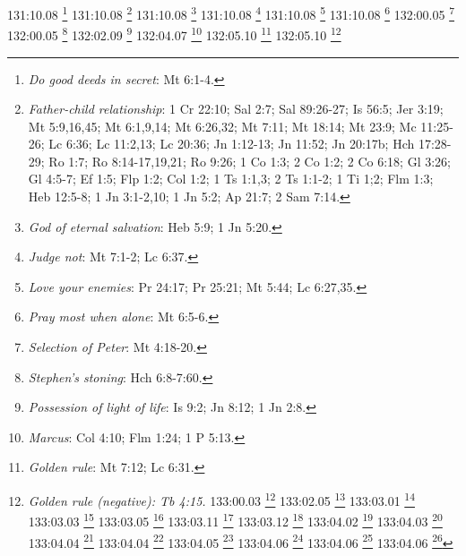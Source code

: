 {{{{{{{{{{{{{{{{{{{{{{{{{{{{{{{131:10.08 \footnote{\textit{Do good deeds in secret}: Mt 6:1-4.}
131:10.08 \footnote{\textit{Father-child relationship}: 1 Cr 22:10; Sal 2:7; Sal 89:26-27; Is 56:5; Jer 3:19; Mt 5:9,16,45; Mt 6:1,9,14; Mt 6:26,32; Mt 7:11; Mt 18:14; Mt 23:9; Mc 11:25-26; Lc 6:36; Lc 11:2,13; Lc 20:36; Jn 1:12-13; Jn 11:52; Jn 20:17b; Hch 17:28-29; Ro 1:7; Ro 8:14-17,19,21; Ro 9:26; 1 Co 1:3; 2 Co 1:2; 2 Co 6:18; Gl 3:26; Gl 4:5-7; Ef 1:5; Flp 1:2; Col 1:2; 1 Ts 1:1,3; 2 Ts 1:1-2; 1 Ti 1;2; Flm 1:3; Heb 12:5-8; 1 Jn 3:1-2,10; 1 Jn 5:2; Ap 21:7; 2 Sam 7:14.}
131:10.08 \footnote{\textit{God of eternal salvation}: Heb 5:9; 1 Jn 5:20.}
131:10.08 \footnote{\textit{Judge not}: Mt 7:1-2; Lc 6:37.}
131:10.08 \footnote{\textit{Love your enemies}: Pr 24:17; Pr 25:21; Mt 5:44; Lc 6:27,35.}
131:10.08 \footnote{\textit{Pray most when alone}: Mt 6:5-6.}
132:00.05 \footnote{\textit{Selection of Peter}: Mt 4:18-20.}
132:00.05 \footnote{\textit{Stephen's stoning}: Hch 6:8-7:60.}
132:02.09 \footnote{\textit{Possession of light of life}: Is 9:2; Jn 8:12; 1 Jn 2:8.}
132:04.07 \footnote{\textit{Marcus}: Col 4:10; Flm 1:24; 1 P 5:13.}
132:05.10 \footnote{\textit{Golden rule}: Mt 7:12; Lc 6:31.}
132:05.10 \footnote{\textit{Golden rule (negative): Tb 4:15.}
133:00.03 \footnote{\textit{God is no respecter of persons}: 2 Cr 19:7; Job 34:19; Eclo 35:12; Hch 10:34; Ro 2:11; Gl 2:6; Gl 3:28; Ef 6:9; Col 3:11.}
133:02.05 \footnote{\textit{Wintered in Nicopolis}: Tit 3:12.}
133:03.01 \footnote{\textit{Crispus}: Hch 18:8; 1 Co 1:14.}
133:03.03 \footnote{\textit{Silas and Timothy}: Hch 18:5.}
133:03.05 \footnote{\textit{Justus}: Hch 18:7; Col 4:11.}
133:03.11 \footnote{\textit{Gaius}: Hch 19:29; Hch 20:4; Ro 16:23; 1 Co 1:14; 3 Jn 1:1.}
133:03.12 \footnote{\textit{Aquila & Priscilla}: Hch 18:2,18,26; Ro 16:3; 1 Co 16:19; 2 Ti 4:19.}
133:04.02 \footnote{\textit{Milk of spiritual truth}: 1 Co 3:1-2; 1 P 2:2.}
133:04.03 \footnote{\textit{Render unto Caesar & God}: Mt 22:21; Mc 12:17; Ro 13:7.}
133:04.04 \footnote{\textit{God dwells in your soul}: Job 32:8,18; Is 63:10-11; Ez 37:14; Mt 10:20; Lc 17:21; Jn 17:21-23; Ro 8:9-11; 1 Co 3:16-17; 1 Co 6:19; 2 Co 6:16; Gl 2:20; 1 Jn 3:24; 1 Jn 4:12-15; Ap 21:3.}
133:04.04 \footnote{\textit{Sons truly yearn to be Godlike}: Sal 82:6; Jn 10:34-35.}
133:04.05 \footnote{\textit{God's spirit lives in us}: Job 32:8,18; Is 63:10-11; Ez 37:14; Mt 10:20; Lc 17:21; Jn 17:21-23; Ro 8:9-11; 1 Co 3:16-17; 1 Co 6:19; 2 Co 6:16; Gl 2:20; 1 Jn 3:24; 1 Jn 4:12-15; Ap 21:3.}
133:04.06 \footnote{\textit{City of God}: Heb 11:10.}
133:04.06 \footnote{\textit{Many mansions}: Jn 14:2.}
133:04.06 \footnote{\textit{Temporal v. spiritual}: Mt 6:19-20; Lc 12:21; 1 Ti 6:17; 1 Jn 2:15-17.}
}}}}}}}}}}}}}}}}}}}}}}}}}}}}}}}}
